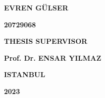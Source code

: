 \begin{titlepage}
\begin{center}
\vspace{36pt}
\par\end{center}

\begin{center}
\textbf{EVREN GÜLSER}
\par\end{center}

\begin{center}
\textbf{20729068}
\par\end{center}

\begin{center}
\vspace{36pt}
\par\end{center}

\begin{center}
\textbf{THESIS SUPERVISOR}
\par\end{center}

\begin{center}
\textbf{Prof. Dr. ENSAR YILMAZ}
\par\end{center}

\begin{center}
\vfill
\par\end{center}

\begin{center}
\textbf{ISTANBUL}
\par\end{center}

\begin{center}
\textbf{2023}
\par\end{center}

\begin{center}
\vfill
\par\end{center}

\end{titlepage}
